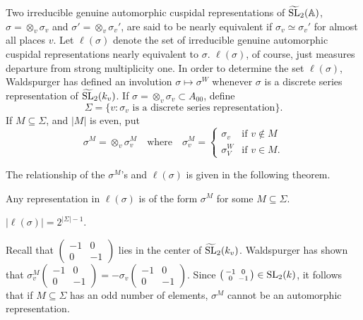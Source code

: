Two irreducible genuine automorphic cuspidal representations of $\widetilde{\mathrm{SL}}_2(\mathbb{A})$, $\sigma = \otimes_v \sigma_v$ and $\sigma' = \otimes_v \sigma_{v}'$, are said to be nearly equivalent if $\sigma_v \simeq \sigma_v'$ for almost all places $v$.
Let $\ell(\sigma)$ denote the set of irreducible genuine automorphic cuspidal representations nearly equivalent to $\sigma$.
$\ell(\sigma)$, of course, just measures departure from strong multiplicity one.
In order to determine the set $\ell(\sigma)$, Waldspurger
has defined an involution $\sigma \mapsto \sigma^W$ whenever $\sigma$ is a discrete series representation of $\widetilde{\mathrm{SL}}_2(k_v)$.
If $\sigma = \otimes_v \sigma_v \subset A_{00}$, define
\[
\Sigma = \{ v: \sigma_v\text{ is a discrete series representation}\}.
\]
If $M \subseteq \Sigma$, and $|M|$ is even, put
\[
\sigma^M = \otimes_v \sigma_v^M \quad \text{where}\quad \sigma_v^M = \begin{cases} \sigma_v & \text{if }v\not\in M \\ \sigma_V^W & \text{if }v \in M.\end{cases}
\]

The relationship of the $\sigma^M$'s and $\ell(\sigma)$ is given in the following theorem.

\begin{theorem}
\label{thm:1.3}
Any representation in $\ell(\sigma)$ is of the form $\sigma^M$ for some $M \subseteq \Sigma$.
\end{theorem}

\begin{corollary}
$|\ell(\sigma)| = 2^{|\Sigma| - 1}$.
\end{corollary}

\begin{remark*}
Recall that $\left(\begin{smallmatrix}
    -1 & 0 \\ 0 & -1
\end{smallmatrix}\right)$ lies in the center of $\widetilde{\mathrm{SL}}_2(k_v)$.
Waldspurger has shown that $\sigma_v^M\left(\begin{smallmatrix}
    -1 & 0 \\ 0 & -1
\end{smallmatrix}\right) = - \sigma_v\left(\begin{smallmatrix}
    -1 & 0 \\ 0 & -1
\end{smallmatrix}\right)$.
Since $\left(\begin{smallmatrix}
    -1 & 0 \\ 0 & -1
\end{smallmatrix}\right) \in \mathrm{SL}_2(k)$, it follows that if $M \subseteq \Sigma$ has an odd number of elements, $\sigma^M$ cannot be an automorphic representation.
\end{remark*}
